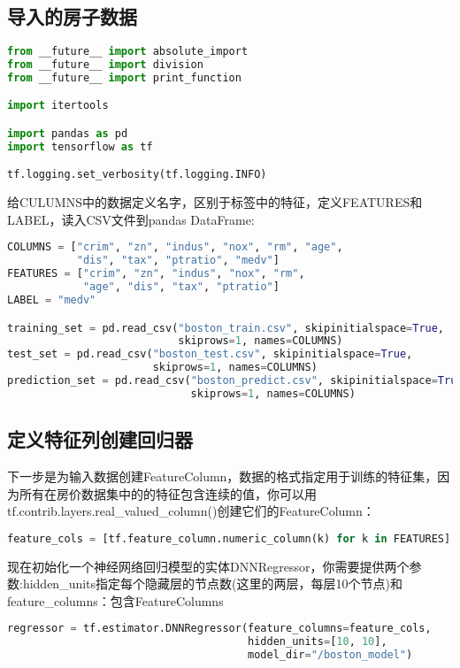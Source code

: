 \subsection{导入的房子数据}
\begin{lstlisting}[language=Python]
from __future__ import absolute_import
from __future__ import division
from __future__ import print_function

import itertools

import pandas as pd
import tensorflow as tf

tf.logging.set_verbosity(tf.logging.INFO)
\end{lstlisting}
给CULUMNS中的数据定义名字，区别于标签中的特征，定义FEATURES和LABEL，读入CSV文件到pandas DataFrame:
\begin{lstlisting}[language=Python]
COLUMNS = ["crim", "zn", "indus", "nox", "rm", "age",
           "dis", "tax", "ptratio", "medv"]
FEATURES = ["crim", "zn", "indus", "nox", "rm",
            "age", "dis", "tax", "ptratio"]
LABEL = "medv"

training_set = pd.read_csv("boston_train.csv", skipinitialspace=True,
                           skiprows=1, names=COLUMNS)
test_set = pd.read_csv("boston_test.csv", skipinitialspace=True,
                       skiprows=1, names=COLUMNS)
prediction_set = pd.read_csv("boston_predict.csv", skipinitialspace=True,
                             skiprows=1, names=COLUMNS)
\end{lstlisting}
\subsection{定义特征列创建回归器}
下一步是为输入数据创建FeatureColumn，数据的格式指定用于训练的特征集，因为所有在房价数据集中的的特征包含连续的值，你可以用tf.contrib.layers.real\_valued\_column()创建它们的FeatureColumn：
\begin{lstlisting}[language=Python]
feature_cols = [tf.feature_column.numeric_column(k) for k in FEATURES]
\end{lstlisting}
现在初始化一个神经网络回归模型的实体DNNRegressor，你需要提供两个参数:hidden\_units指定每个隐藏层的节点数(这里的两层，每层10个节点)和feature\_columns：包含FeatureColumns
\begin{lstlisting}[language=Python]
regressor = tf.estimator.DNNRegressor(feature_columns=feature_cols,
                                      hidden_units=[10, 10],
                                      model_dir="/boston_model")
\end{lstlisting}
